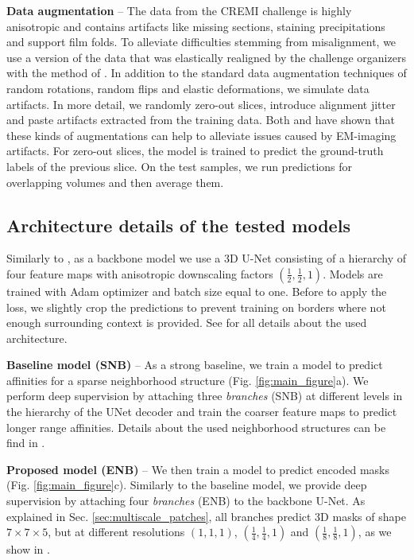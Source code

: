 \textbf{Data augmentation} -- The data from the CREMI challenge is highly \linebreak anisotropic and contains artifacts like missing sections, staining precipitations and support film folds. 
To alleviate difficulties stemming from misalignment, we use a version of the data that was elastically realigned by the challenge organizers with the method of \cite{saalfeld2012elastic}.
In addition to the standard data augmentation techniques of random rotations, random flips and  elastic deformations, we simulate data artifacts.
In more detail, we randomly zero-out slices, introduce alignment jitter and paste artifacts extracted from the training data. Both \cite{funke2018large} and \cite{lee2017superhuman} have shown
that these kinds of augmentations can help to alleviate issues caused by EM-imaging artifacts. For zero-out slices, the model is trained to predict the ground-truth labels of the previous slice.
On the test samples, we run predictions for overlapping volumes and then average them.


 
 


\subsection{Architecture details of the tested models}
Similarly to \cite{lee2019learning,lee2017superhuman,wolf2018mutex}, as a backbone model we use a 3D U-Net consisting of a hierarchy of four feature maps with anisotropic downscaling factors $(\frac{1}{2},\frac{1}{2},1)$. 
Models are trained with Adam optimizer and batch size equal to one. Before to apply the loss, we slightly crop the predictions to prevent training on borders where not enough surrounding context is provided. 
See  for all details about the used architecture. 

 
\textbf{Baseline model (SNB)} -- As a strong baseline, we train a model to predict affinities for a sparse neighborhood structure (Fig. \ref{fig:main_figure}a). We perform deep supervision by attaching three \emph{\sparseBr branches} (SNB) at different levels in the hierarchy of the UNet decoder and train the coarser feature maps to predict longer range affinities. Details about the used neighborhood structures can be find in .

\textbf{Proposed model (ENB)} -- We then train a model to predict encoded \maskname masks (Fig. \ref{fig:main_figure}c). Similarly to the baseline model, we provide deep supervision by attaching four \emph{\encBr branches} (ENB) to the backbone U-Net. As explained in Sec. \ref{sec:multiscale_patches}, all branches predict 3D masks of shape $7 \times 7 \times 5$, but at different resolutions $(1,1,1)$, $(\frac{1}{4},\frac{1}{4},1)$ and $(\frac{1}{8},\frac{1}{8},1)$, as we show in .

